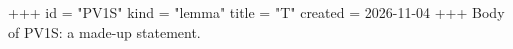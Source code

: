 +++
id = "PV1S"
kind = "lemma"
title = "T"
created = 2026-11-04
+++
Body of PV1S: a made-up statement.
